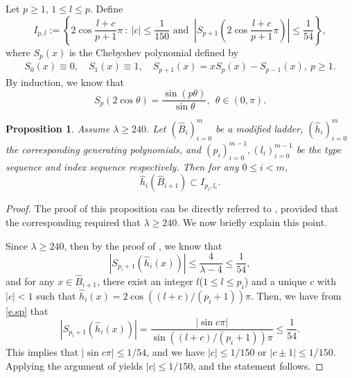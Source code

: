 \documentclass[reqno,11pt,graphicx,]{amsart}
\numberwithin{equation}{section}
\theoremstyle{plain}
\newcommand{\3}{\mathbf{3}}
\newtheorem{proposition}[theorem]{Proposition}
\begin{document}
	Let $p\ge1$, $1\le l\le p$. Define
	$$I_{p,l}:=\left\{2\cos\frac{l+c}{p+1}\pi\ :\ |c|\le\frac{1}{150}\mbox{ and }
	\ \left|S_{p+1}\left(2\cos\frac{l+c}{p+1}\pi\right)\right|\le\frac{1}{54}
	\right\},$$
	where $S_{p}(x)$ is the Chebyshev polynomial defined by
	\begin{align*}
		S_0(x)\equiv0,\quad S_1(x)\equiv1,\quad S_{p+1}(x)=xS_{p}(x)-S_{p-1}(x),\ p\geq1.
	\end{align*}
By induction, we know that 
\begin{equation}\label{e.sp}
 S_p(2\cos\theta)=\frac{\sin (p\theta)}{\sin\theta},\ \ \theta\in(0,\pi).
\end{equation}
	\begin{proposition}\label{index}
		Assume $\lambda\ge240$. Let $(\hat{B}_i)_{i=0}^m$ be a modified ladder,
		$(\hat{h}_i)_{i=0}^{m}$ the corresponding generating polynomials,
		and $(p_i)_{i=0}^{m-1}, (l_i)_{i=0}^{m-1}$ be the type sequence and index sequence respectively. Then for any
		$0\le i<m$,
		$$\hat{h}_i(\hat{B}_{i+1})\subset I_{p_i,l_i}.$$
	\end{proposition}
	\begin{proof}
		The proof of this proposition can be directly referred to \cite[Proposition 3.1]{FLW2011}, provided that the corresponding required that $\lambda\geq240$. We now briefly explain this point.
		
		Since $\lambda\geq240$, then by the proof of \cite[Proposition 3.1]{FLW2011}, we know that
		\begin{equation*}
			|S_{p_i+1}(\hat{h}_{i}(x))|\leq\frac{4}{\lambda-4}\leq\frac{1}{54},
		\end{equation*}
		and for any $x\in\hat{B}_{i+1}$, there exist an integer $l$($1\leq l\leq p_i$) and a unique $c$ with $|c|<1$ such that $\hat{h}_i(x)=2\cos((l+c)/(p_i+1))\pi$. Then, we have from \eqref{e.sp} that
		\begin{equation*}
			|S_{p_i+1}(\hat{h}_{i}(x))|=\frac{|\sin c\pi|}{\sin((l+c)/(p_i+1))\pi}\leq\frac{1}{54}.
		\end{equation*}
		This implies that $|\sin c\pi|\leq1/54$, and we have $|c|\leq1/150$ or $|c\pm1|\leq1/150.$ Applying the argument of \cite[Proposition 3.1]{FLW2011} yields $|c|\leq 1/150$, and the statement follows.
	\end{proof}
	
\end{document}
